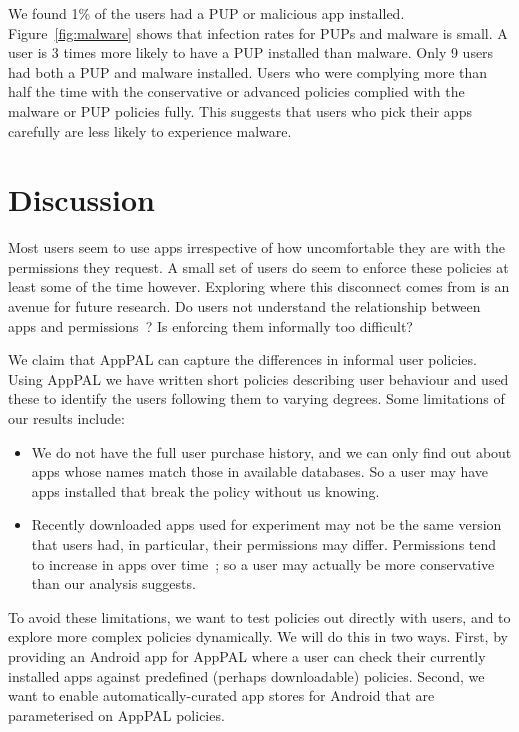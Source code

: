 \documentclass[]{soups-poster}
\newcommand{\citep}[1]{\cite{#1}}
\begin{document}
We found 1\% of the users had a PUP or malicious app installed.
Figure~\ref{fig:malware} shows that infection rates for PUPs and malware is small.
A user is 3 times more likely to have a PUP installed than malware.
Only 9 users had both a PUP and malware installed.
Users who were complying more than half the time with the conservative or advanced policies complied with the malware or PUP policies fully.
This suggests that users who pick their apps carefully are less likely to experience malware.

\section{Discussion}

Most users seem to use apps irrespective of how uncomfortable they are with the permissions they request.
A small set of users do seem to enforce these policies at least some of the time however.
Exploring where this disconnect comes from is an avenue for future research.
Do users not understand the relationship between apps and permissions~\citep{Felt:2012hma}?
Is enforcing them informally too difficult?

We claim that AppPAL can capture the differences in informal user policies. %
Using AppPAL we have written short policies describing user behaviour and used these to identify the users following them to varying degrees.
Some limitations of our results include:
\begin{itemize}
\item We do not have the full user purchase history, and we can only find out about apps whose names match those in available databases.  %
  So a user may have apps installed that break the policy without us knowing.
\item Recently downloaded apps used for experiment may not be the same version that users had, in particular, their permissions may differ.
  Permissions tend to increase in apps over time~\citep{Wei:2012id}; so a user may actually be more conservative than our analysis suggests.
\end{itemize}

To avoid these limitations, we want to test policies out directly with users, and to explore more complex policies dynamically.
We will do this in two ways.
First, by providing an Android app for AppPAL where a user can check their currently installed apps against predefined (perhaps downloadable) policies.
Second, we want to enable automatically-curated app stores for Android that are parameterised on AppPAL policies.



\end{document}
